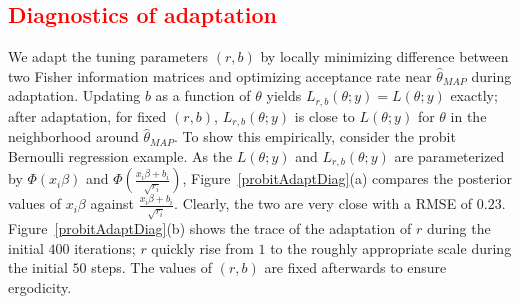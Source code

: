\documentclass[11pt]{article}
\newcommand{\leo}[1]{{\textcolor{red}{#1}}}
\begin{document}
\leo{
\subsection{Diagnostics of adaptation}
}
We adapt the tuning parameters $(r,b)$ by locally minimizing difference between two Fisher information matrices and
 optimizing acceptance rate near 
 $\hat\theta_{MAP}$ during adaptation. Updating $b$  as a function
 of $\theta$ yields $L_{r,b}(\theta;y)=L(\theta;y)$ exactly;  after adaptation,
for  fixed
 $(r,b)$, $L_{r,b}(\theta;y)$ is close to $L(\theta;y)$ for $\theta$ in the neighborhood
 around $\hat\theta_{MAP}$. To show this empirically, consider the
 probit Bernoulli regression example. As the $L(\theta;y)$ and $L_{r,b}(\theta;y)$
 are parameterized by $\Phi(x_i\beta)$ and $\Phi(\frac{x_i\beta+b_i}{\sqrt{r_i}})$, Figure~\ref{probitAdaptDiag}(a) compares the posterior values of $x_i\beta$ against
$\frac{x_i\beta+b_i}{\sqrt{r_i}}$. Clearly, the two are very close with a
RMSE of $0.23$.
Figure~\ref{probitAdaptDiag}(b) shows the trace of the adaptation of $r$
during
the initial $400$ iterations;
$r$ quickly rise from $1$ to the roughly  appropriate scale during the
initial $50$ steps. The values of $(r,b)$ are fixed afterwards to ensure
ergodicity.
\end{document}
